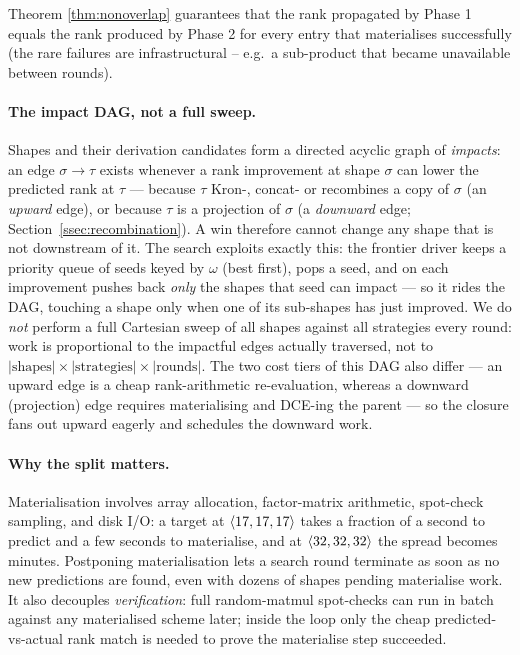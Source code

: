 Theorem \ref{thm:nonoverlap} guarantees that the rank propagated by
Phase 1 equals the rank produced by Phase 2 for every entry that
materialises successfully (the rare failures are infrastructural --
e.g.\ a sub-product that became unavailable between rounds).

\paragraph{The impact DAG, not a full sweep.} Shapes and their
derivation candidates form a directed acyclic graph of \emph{impacts}:
an edge \(\sigma \to \tau\) exists whenever a rank improvement at shape
\(\sigma\) can lower the predicted rank at \(\tau\) --- because \(\tau\)
Kron-, concat- or recombines a copy of \(\sigma\) (an \emph{upward} edge),
or because \(\tau\) is a projection of \(\sigma\) (a \emph{downward}
edge; Section~\ref{ssec:recombination}). A win therefore cannot change
any shape that is not downstream of it. The search exploits exactly this:
the frontier driver keeps a priority queue of
seeds keyed by \(\omega\) (best first), pops a seed, and on each
improvement pushes back \emph{only} the shapes that seed can impact ---
so it rides the DAG, touching a shape only when one of its sub-shapes has
just improved. We do \emph{not} perform a full Cartesian sweep of all
shapes against all strategies every round: work is proportional to the
impactful edges actually traversed, not to
\(|\text{shapes}| \times |\text{strategies}| \times |\text{rounds}|\).
The two cost tiers of this DAG also differ --- an upward edge is a cheap
rank-arithmetic re-evaluation, whereas a downward (projection) edge
requires materialising and DCE-ing the parent --- so the closure fans out
upward eagerly and schedules the downward work.

\paragraph{Why the split matters.} Materialisation involves array
allocation, factor-matrix arithmetic, spot-check sampling, and disk
I/O: a target at \(\langle 17, 17, 17 \rangle\) takes a fraction of a
second to predict and a few seconds to materialise, and at
\(\langle 32, 32, 32 \rangle\) the spread becomes minutes. Postponing
materialisation lets a search round terminate as soon as no new
predictions are found, even with dozens of shapes pending
materialise work. It also decouples \emph{verification}: full
random-matmul spot-checks can run in batch against any materialised
scheme later; inside the loop only the cheap predicted-vs-actual
rank match is needed to prove the materialise step succeeded.

